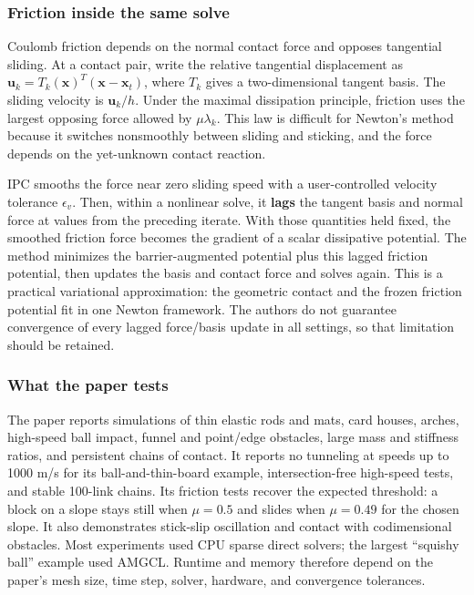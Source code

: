 \subsubsection{Friction inside the same solve}\label{04-visual-computing-ii-ch029-friction-inside-the-same-solve}

\hypertarget{04-visual-computing-ii-ch029-friction-inside-the-same-solve}{}

Coulomb friction depends on the normal contact force and opposes tangential sliding. At a contact pair, write the relative tangential displacement as \(\mathbf{u}_k=T_k(\mathbf{x})^T(\mathbf{x}-\mathbf{x}_t)\), where \(T_k\) gives a two-dimensional tangent basis. The sliding velocity is \(\mathbf{u}_k/h\). Under the maximal dissipation principle, friction uses the largest opposing force allowed by \(\mu\lambda_k\). This law is difficult for Newton's method because it switches nonsmoothly between sliding and sticking, and the force depends on the yet-unknown contact reaction.

IPC smooths the force near zero sliding speed with a user-controlled velocity tolerance \(\epsilon_v\). Then, within a nonlinear solve, it \textbf{lags} the tangent basis and normal force at values from the preceding iterate. With those quantities held fixed, the smoothed friction force becomes the gradient of a scalar dissipative potential. The method minimizes the barrier-augmented potential plus this lagged friction potential, then updates the basis and contact force and solves again. This is a practical variational approximation: the geometric contact and the frozen friction potential fit in one Newton framework. The authors do not guarantee convergence of every lagged force/basis update in all settings, so that limitation should be retained.

\subsubsection{What the paper tests}\label{04-visual-computing-ii-ch029-what-the-paper-tests}

\hypertarget{04-visual-computing-ii-ch029-what-the-paper-tests}{}

The paper reports simulations of thin elastic rods and mats, card houses, arches, high-speed ball impact, funnel and point/edge obstacles, large mass and stiffness ratios, and persistent chains of contact. It reports no tunneling at speeds up to 1000 m/s for its ball-and-thin-board example, intersection-free high-speed tests, and stable 100-link chains. Its friction tests recover the expected threshold: a block on a slope stays still when \(\mu=0.5\) and slides when \(\mu=0.49\) for the chosen slope. It also demonstrates stick-slip oscillation and contact with codimensional obstacles. Most experiments used CPU sparse direct solvers; the largest ``squishy ball'' example used AMGCL. Runtime and memory therefore depend on the paper's mesh size, time step, solver, hardware, and convergence tolerances.

